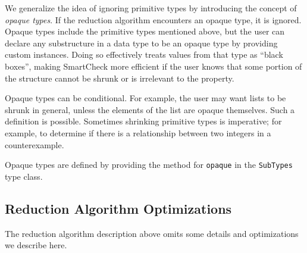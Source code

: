 \documentclass{sigplanconf}
\newcommand{\ttp}[1]{\texttt{#1}}
\begin{document}
We generalize the idea of ignoring primitive types by introducing the concept of
\emph{opaque types}.  If the reduction algorithm encounters an opaque type, it is
ignored.  Opaque types include the primitive types mentioned above, but the
user can declare any substructure in a data type to be an opaque type by
providing custom instances.  Doing so effectively treats values from that type
as ``black boxes'', making SmartCheck more efficient if the user knows that some
portion of the structure cannot be shrunk or is irrelevant to the property.

Opaque types can be conditional.  For example, the user may want lists to be
shrunk in general, unless the elements of the list are opaque themselves.  Such
a definition is possible.  Sometimes shrinking primitive types is imperative;
for example, to determine if there is a relationship between two integers in a
counterexample.

Opaque types are defined by providing the method for \ttp{opaque} in the
\ttp{SubTypes} type class.






\subsection{Reduction Algorithm Optimizations}\label{sec:optimizations}
The reduction algorithm description above omits some details and optimizations
we describe here.
\end{document}
